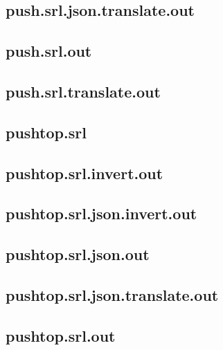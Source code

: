 \subsection{push.srl.json.translate.out}
\label{app:push_srl.json.translate.out}

\subsection{push.srl.out}
\label{app:push_srl.out}

\subsection{push.srl.translate.out}
\label{app:push_srl.translate.out}

\subsection{pushtop.srl}
\label{app:pushtop_srl}

\subsection{pushtop.srl.invert.out}
\label{app:pushtop_srl.invert.out}

\subsection{pushtop.srl.json.invert.out}
\label{app:pushtop_srl.json.invert.out}

\subsection{pushtop.srl.json.out}
\label{app:pushtop_srl.json.out}

\subsection{pushtop.srl.json.translate.out}
\label{app:pushtop_srl.json.translate.out}

\subsection{pushtop.srl.out}
\label{app:pushtop_srl.out}

